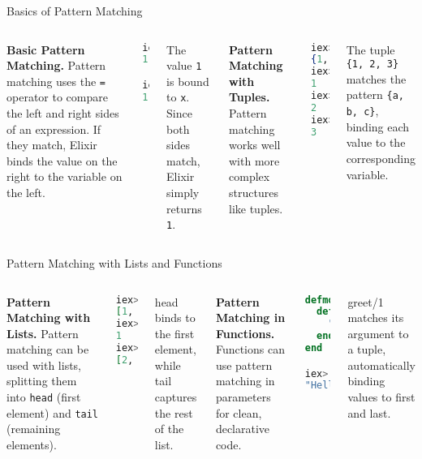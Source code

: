 \documentclass[aspectratio=169, table]{beamer}
\begin{document}
\begin{frame}[fragile]{Basics of Pattern Matching}
\vspace{17pt}
\begin{columns}[t]

\textbf{Basic Pattern Matching.}  
Pattern matching uses the \texttt{=} operator to compare the left and right sides of an expression.  
If they match, Elixir binds the value on the right to the variable on the left.

\begin{lstlisting}[language=Elixir]
iex> x = 1
1

iex> 1 = x
1
\end{lstlisting}

The value \texttt{1} is bound to \texttt{x}. Since both sides match, Elixir simply returns \texttt{1}.

\textbf{Pattern Matching with Tuples.}  
Pattern matching works well with more complex structures like tuples.

\begin{lstlisting}[language=Elixir]
iex> {a, b, c} = {1, 2, 3}
{1, 2, 3}
iex> a
1
iex> b
2
iex> c
3
\end{lstlisting}

The tuple \texttt{\{1, 2, 3\}} matches the pattern \texttt{\{a, b, c\}}, binding each value to the corresponding variable.
\end{columns}
\end{frame}

\begin{frame}[fragile]{Pattern Matching with Lists and Functions}
\vspace{20pt}
\begin{columns}[t]

\textbf{Pattern Matching with Lists.}  
Pattern matching can be used with lists, splitting them into \texttt{head} (first element) and \texttt{tail} (remaining elements).

\begin{lstlisting}[language=Elixir]
iex> [head | tail] = [1, 2, 3]
[1, 2, 3]
iex> head
1
iex> tail
[2, 3]
\end{lstlisting}

head binds to the first element, while tail  
captures the rest of the list.

\textbf{Pattern Matching in Functions.}  
Functions can use pattern matching in parameters for clean, declarative code.

\begin{lstlisting}[language=Elixir]
defmodule Example do
  def greet({first, last}) do
    "Hello, #{first} #{last}!"
  end
end

iex> Example.greet({"John", "Doe"})
"Hello, John Doe!"
\end{lstlisting}

greet/1 matches its argument to a tuple,  
automatically binding values to first and last.
\end{columns}
\end{frame}
\end{document}
